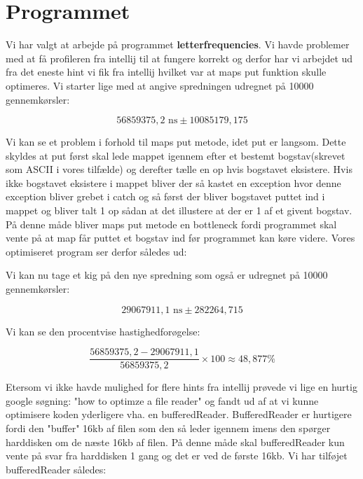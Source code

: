 \documentclass[class=report, crop=false]{standalone}
\begin{document}
    \section{Programmet}
    Vi har valgt at arbejde på programmet \textbf{letterfrequencies}. Vi havde problemer med at få profileren fra intellij til at fungere korrekt og derfor har vi arbejdet ud fra det eneste hint vi fik fra intellij hvilket var at maps put funktion skulle optimeres.
    Vi starter lige med at angive spredningen udregnet på 10000 gennemkørsler:
    \begin{tcolorbox}
        \[ 56859375,2 \text{ ns} \pm 10085179,175   \]
    \end{tcolorbox}

    \noindent Vi kan se et problem i forhold til maps put metode, idet put er langsom. Dette skyldes at put først skal lede mappet igennem efter et bestemt bogstav(skrevet som ASCII i vores tilfælde) og derefter tælle en op hvis bogstavet eksistere. 
    Hvis ikke bogstavet eksistere i mappet bliver der så kastet en exception hvor denne exception bliver grebet i catch og så først der bliver bogstavet puttet ind i mappet og bliver talt 1 op sådan at det illustere at der er 1 af et givent bogstav.
    På denne måde bliver maps put metode en bottleneck fordi programmet skal vente på at map får puttet et bogstav ind før programmet kan køre videre. Vores optimiseret program ser derfor således ud:
    \lstset{style=codestyle}
    

    \noindent Vi kan nu tage et kig på den nye spredning som også er udregnet på 10000 gennemkørsler:
    \begin{tcolorbox}
        \[ 29067911,1 \text{ ns} \pm 282264,715  \]
    \end{tcolorbox}

    \noindent Vi kan se den procentvise hastighedforøgelse:
    \begin{tcolorbox}
        \[ \frac{56859375,2 - 29067911,1}{56859375,2} \times 100 \approx 48,877\% \]
    \end{tcolorbox}

    \noindent Etersom vi ikke havde mulighed for flere hints fra intellij prøvede vi lige en hurtig google søgning: "how to optimze a file reader" og fandt ud af at vi kunne optimisere koden yderligere vha. en bufferedReader. 
    BufferedReader er hurtigere fordi den "buffer" 16kb af filen som den så leder igennem imens den spørger harddisken om de næste 16kb af filen. På denne måde skal bufferedReader kun vente på svar fra harddisken 1 gang og det er ved de første 16kb. Vi har tilføjet bufferedReader således:
    \lstset{style=codestyle}
    
    
\end{document}
